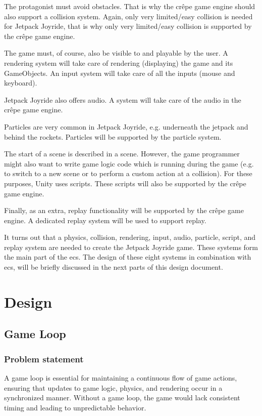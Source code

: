 \documentclass{projdoc}
\begin{document}
The protagonist must avoid obstacles. That is why the cr\^epe game engine should also
support a collision system. Again, only very limited/easy collision is needed for
Jetpack Joyride, that is why only very limited/easy collision is supported by the
cr\^epe game engine.

The game must, of course, also be visible to and playable by the user. A rendering
system will take care of rendering (displaying) the game and its GameObjects. An
input system will take care of all the inputs (mouse and keyboard).

Jetpack Joyride also offers audio. A system will take care of the audio in the
cr\^epe game engine.

Particles are very common in Jetpack Joyride, e.g. underneath the jetpack and behind
the rockets. Particles will be supported by the particle system.

The start of a scene is described in a scene. However, the game programmer might also
want to write game logic code which is running during the game (e.g. to switch to a
new scene or to perform a custom action at a collision). For these purposes, Unity
uses scripts. These scripts will also be supported by the cr\^epe game engine.

Finally, as an extra, replay functionality will be supported by the cr\^epe game
engine. A dedicated replay system will be used to support replay.

It turns out that a physics, collision, rendering, input, audio, particle, script,
and replay system are needed to create the Jetpack Joyride game. These systems form
the main part of the \gls{ecs}. The design of these eight systems in combination with
\gls{ecs}, will be briefly discussed in the next parts of this design document.

\section{Design}

\subsection{Game Loop}

\subsubsection{Problem statement}

A game loop is essential for maintaining a continuous flow of game actions, ensuring
that updates to game logic, physics, and rendering occur in a synchronized manner.
Without a game loop, the game would lack consistent timing and leading to
unpredictable behavior.
\end{document}

